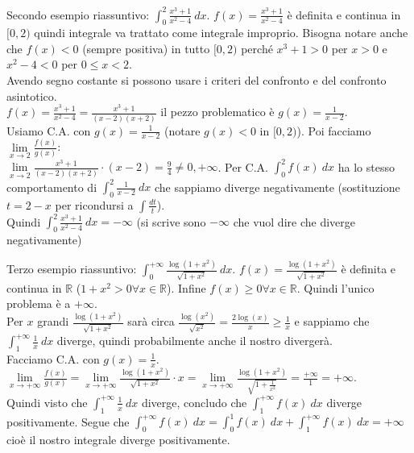 \begin{example}
Secondo esempio riassuntivo: $\int_0^2 \frac{x^3 + 1}{x^2 -4}\:dx$. $f(x) = \frac{x^3 + 1}{x^2 -4}$ è definita e continua in $[0,2)$ quindi integrale va trattato come integrale improprio. Bisogna notare anche che $f(x) < 0$ (sempre positiva) in tutto $[0,2)$ perché $x^3+1 > 0$ per $x>0$ e $x^2 -4 < 0$ per $0 \leq x < 2$.\\
Avendo segno costante si possono usare i criteri del confronto e del confronto asintotico.\\
$f(x) = \frac{x^3+1}{x^2-4} = \frac{x^3 +1}{(x-2)(x+2)}$ il pezzo problematico è $g(x) = \frac{1}{x-2}$.\\
Usiamo C.A. con $g(x) = \frac{1}{x-2}$ (notare $g(x) < 0$ in $[0,2)$). Poi facciamo $\lim\limits_{x\to 2}\frac{f(x)}{g(x)}$:\\
$\lim\limits_{x\to 2} \frac{x^3 +1}{(x-2)(x+2)}\cdot(x-2) = \frac{9}{4} \neq 0, +\infty$. Per C.A. $\int_0^2 f(x)\:dx$ ha lo stesso comportamento di $\int_0^2 \frac{1}{x-2}\:dx$ che sappiamo diverge negativamente (sostituzione $t=2-x$ per ricondursi a $\int \frac{dt}{t}$).\\
Quindi $\int_0^2 \frac{x^3 + 1}{x^2 -4}\:dx = -\infty$ (si scrive sono $-\infty$ che vuol dire che diverge negativamente)
\end{example}

\begin{example}
Terzo esempio riassuntivo: $\int_0^{+\infty}\frac{\log(1+x^2)}{\sqrt{1+x^2}}\:dx$. $f(x) = \frac{\log(1+x^2)}{\sqrt{1+x^2}}$ è definita e continua in $\mathbb{R}$ ($1 + x^2 > 0 \forall x \in \mathbb{R}$). Infine $f(x) \geq 0 \forall x \in \mathbb{R}$. Quindi l'unico problema è a $+\infty$.\\
Per $x$ grandi $\frac{\log(1+x^2)}{\sqrt{1+x^2}}$ sarà circa $\frac{\log(x^2)}{\sqrt{x^2}} = \frac{2\log(x)}{x} \geq \frac{1}{x}$ e sappiamo che $\int_1^{+\infty}\frac{1}{x}\:dx$ diverge, quindi probabilmente anche il nostro divergerà.\\
Facciamo C.A. con $g(x) = \frac{1}{x}$. $\lim\limits_{x\to +\infty}\frac{f(x)}{g(x)} = \lim\limits_{x\to +\infty} \frac{\log(1+x^2)}{\sqrt{1+x^2}}\cdot x = \lim\limits_{x\to +\infty} \frac{\log(1+x^2)}{\sqrt{1+\frac{1}{x^2}}} = \frac{+\infty}{1} = +\infty$.\\
Quindi visto che $\int_1^{+\infty}\frac{1}{x}\:dx$ diverge, concludo che $\int_1^{+\infty}f(x)\:dx$ diverge positivamente. Segue che $\int_0^{+\infty}f(x)\:dx = \int_0^{1}f(x)\:dx + \int_1^{+\infty}f(x)\:dx = +\infty$ cioè il nostro integrale diverge positivamente.
\end{example}

